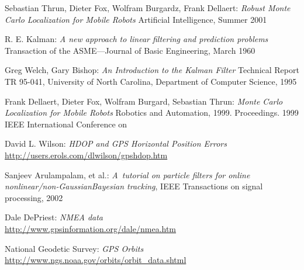 \clearpage
{}
\begin{thebibliography}{99}

Sebastian Thrun, Dieter Fox, Wolfram Burgardz, Frank Dellaert:
\emph{Robust Monte Carlo Localization for Mobile Robots}
Artificial Intelligence, Summer 2001

R. E. Kalman:
\emph{A new approach to linear filtering and prediction problems}
Transaction of the ASME—Journal of Basic Engineering, March 1960

Greg Welch,
Gary Bishop:
\emph{An Introduction to the Kalman Filter}
Technical Report TR 95-041, University of North Carolina,
Department of Computer Science, 1995



Frank Dellaert,
Dieter Fox,
Wolfram Burgard,
Sebastian Thrun:
\emph{Monte Carlo Localization for Mobile Robots}
Robotics and Automation, 1999. Proceedings. 1999 IEEE International Conference on


David L. Wilson:
\emph{HDOP and GPS Horizontal Position Errors} \\
\url{http://users.erols.com/dlwilson/gpshdop.htm}

Sanjeev Arulampalam, et al.:
{\em A~tutorial on particle filters for online nonlinear/non-GaussianBayesian tracking},
IEEE Transactions on signal processing, 2002

Dale DePriest:
\emph{NMEA data} \\
\url{http://www.gpsinformation.org/dale/nmea.htm}

National Geodetic Survey:
\emph{GPS Orbits} \\
\url{http://www.ngs.noaa.gov/orbits/orbit_data.shtml}

\end{thebibliography}
